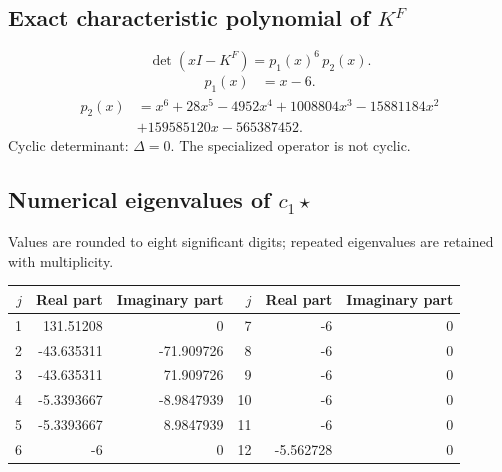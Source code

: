\documentclass[10pt,a4paper]{article}
\begin{document}
\subsection*{Exact characteristic polynomial of $K^F$}
\[\det(xI-K^F)=p_{1}(x)^{6}\,p_{2}(x).\]
\[\begin{aligned}p_{1}(x)&=x - 6.\end{aligned}\]
\[\begin{aligned}p_{2}(x)&=x^{6} + 28 x^{5} - 4952 x^{4} + 1008804 x^{3} - 15881184 x^{2}\\&+159585120 x - 565387452.\end{aligned}\]
Cyclic determinant: $\Delta=0$. The specialized operator is not cyclic.
\subsection*{Numerical eigenvalues of $c_1\star$}
Values are rounded to eight significant digits; repeated eigenvalues are retained with multiplicity.
\begin{center}\small\begin{tabular}{rrr@{\qquad}rrr}\toprule $j$ & Real part & Imaginary part & $j$ & Real part & Imaginary part\\\midrule
1 & 131.51208 & 0 & 7 & -6 & 0\\
2 & -43.635311 & -71.909726 & 8 & -6 & 0\\
3 & -43.635311 & 71.909726 & 9 & -6 & 0\\
4 & -5.3393667 & -8.9847939 & 10 & -6 & 0\\
5 & -5.3393667 & 8.9847939 & 11 & -6 & 0\\
6 & -6 & 0 & 12 & -5.562728 & 0\\
\bottomrule\end{tabular}\end{center}
\end{document}
